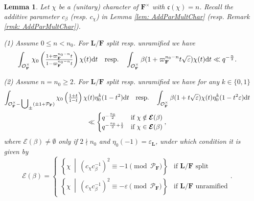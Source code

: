 \documentclass[A4]{amsart}
\def\leq{\leqslant}
\def\geq{\geqslant}
\newtheorem{lemma}      [theorem]{Lemma}
\numberwithin{equation}{section} \everymath{\displaystyle}
\newcommand{\ud}{\mathrm{d}}
\newcommand{\F}{\mathbf{F}}
\newcommand{\bL}{\mathbf{L}}
\newcommand{\vO}{\mathcal{O}}
\newcommand{\vP}{\mathcal{P}}
\newcommand{\cond}{\mathfrak{c}}
\newcommand{\Ecp}{\boldsymbol{\mathcal{E}}}
\begin{document}
\begin{lemma} \label{lem: JacTypeSRC}
	Let $\chi$ be a (unitary) character of $\F^{\times}$ with $\cond(\chi)=n$. Recall the additive parameter $c_{\beta}$ (resp. $c_{\chi}$) in Lemma \ref{lem: AddParMultChar} (resp. Remark \ref{rmk: AddParMultChar}).
		
\noindent (1) Assume $0 \leq n < n_0$. For $\bL/\F$ \emph{split} resp. \emph{unramified} we have
	$$ \int_{\vO_{\F}^{\times}} \chi_0 \left( \tfrac{1+\varpi_{\F}^{n_0-n} t}{1-\varpi_{\F}^{n_0-n} t} \right) \chi(t) \ud t \quad {\rm resp.} \quad \int_{\vO_{\F}^{\times}} \beta(1+\varpi_{\F}^{n_0-n} t \sqrt{\varepsilon}) \chi(t) \ud t \ll q^{-\frac{n}{2}}. $$
	
\noindent (2) Assume $n=n_0 \geq 2$. For $\bL/\F$ \emph{split} resp. \emph{unramified} we have for any $k \in \{ 0,1 \}$
\begin{multline*} 
	\int_{\vO_{\F}^{\times} - \sideset{}{_{\pm}} \bigcup (\pm 1+ \vP_{\F})} \chi_0 \left( \tfrac{1+t}{1-t} \right) \chi(t) \eta_0^k(1-t^2) \ud t \quad {\rm resp.} \quad \int_{\vO_{\F}^{\times}} \beta(1+t \sqrt{\varepsilon}) \chi(t) \eta_0^k(1-t^2 \varepsilon) \ud t \\
	 \ll \begin{cases} q^{-\frac{n_0}{2}} & \text{if } \chi \notin \Ecp(\beta) \\ q^{-\frac{n_0}{2}+\frac{1}{2}} & \text{if } \chi \in \Ecp(\beta) \end{cases}, 
\end{multline*}
	where $\Ecp(\beta) \neq \emptyset$ only if $2 \nmid n_0$ and $\eta_0(-1)=\varepsilon_{\bL}$, under which condition it is given by
	$$ \Ecp(\beta) = \begin{cases}
	\left\{ \chi \ \middle| \ (c_{\chi} c_{\beta}^{-1})^2 \equiv -1 \pmod{\vP_{\F}} \right\} & \text{if } \bL/\F \text{ split} \\
	\left\{ \chi \ \middle| \  (c_{\chi} c_{\beta}^{-1})^2 \equiv - \varepsilon \pmod{\vP_{\F}} \right\} & \text{if } \bL/\F \text{ unramified}
	\end{cases}. $$
\end{lemma}
\end{document}
